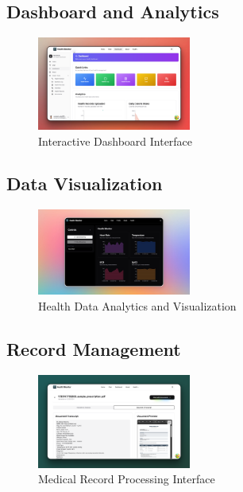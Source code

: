 \subsection{Dashboard and Analytics}
\begin{figure}[H]
    \centering
    \includegraphics[width=0.45\textwidth]{public/landing/hm-dashboard.png}
    \caption{Interactive Dashboard Interface}
\end{figure}

\subsection{Data Visualization}
\begin{figure}[H]
    \centering
    \includegraphics[width=0.45\textwidth]{public/landing/hm-graphs.png}
    \caption{Health Data Analytics and Visualization}
\end{figure}

\subsection{Record Management}
\begin{figure}[H]
    \centering
    \includegraphics[width=0.45\textwidth]{public/landing/hm-record-transcript.png}
    \caption{Medical Record Processing Interface}
\end{figure}

